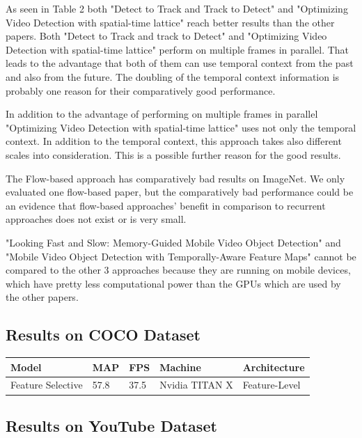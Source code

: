 \documentclass[conference]{IEEEtran}
\begin{document}
As seen in Table 2 both "Detect to Track and Track to Detect" and "Optimizing Video Detection with spatial-time lattice" reach better results than the other papers. Both "Detect to Track and track to Detect" and "Optimizing Video Detection with spatial-time lattice" perform on multiple frames in parallel. That leads to the advantage that both of them can use temporal context from the past and also from the future. The doubling of the temporal context information is probably one reason for their comparatively good performance. \newline

In addition to the advantage of performing on multiple frames in parallel "Optimizing Video Detection with spatial-time lattice" uses not only the temporal context. In addition to the temporal context, this approach takes also different scales into consideration. This is a possible further reason for the good results. \newline

The Flow-based approach \cite{3} has comparatively bad results on ImageNet. We only evaluated one flow-based paper, but the comparatively bad performance could be an evidence that flow-based approaches' benefit in comparison to recurrent approaches does not exist or is very small. \newline

"Looking Fast and Slow: Memory-Guided Mobile Video Object Detection" and "Mobile Video Object Detection with Temporally-Aware Feature Maps" cannot be compared to the other 3 approaches because they are running on mobile devices, which have pretty less computational power than the GPUs which are used by the other papers.  

\subsection{Results on COCO Dataset}

\begin{tabular}{ | p{2cm} | p{2em}| p{2em} | p{4em} | p{5em} | } 
 \hline
 Model & MAP & FPS & Machine & Architecture \\
 \hline
 Feature Selective \cite{b6} & 57.8 & 37.5 & Nvidia TITAN X & Feature-Level \\
 \hline
\end{tabular}

\subsection{Results on YouTube Dataset}
\end{document}
